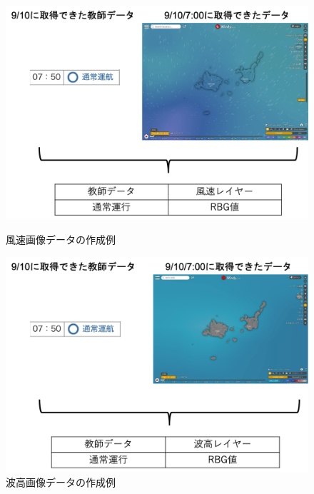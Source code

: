 \begin{figure}[htbp]
 \begin{minipage}{0.5\hsize}
  \begin{center}
   \includegraphics[keepaspectratio, scale=0.38]{fig/chapter3/wind_speed_data.png}
  \end{center}
  \caption{風速画像データの作成例}
  \label{wind_data}
 \end{minipage}
 \begin{minipage}{0.5\hsize}
  \begin{center}
  \includegraphics[keepaspectratio, scale=0.38]{fig/chapter3/wave_height_data.png}
  \end{center}
   \caption{波高画像データの作成例}
  \label{wave_data}
 \end{minipage}
\end{figure}

